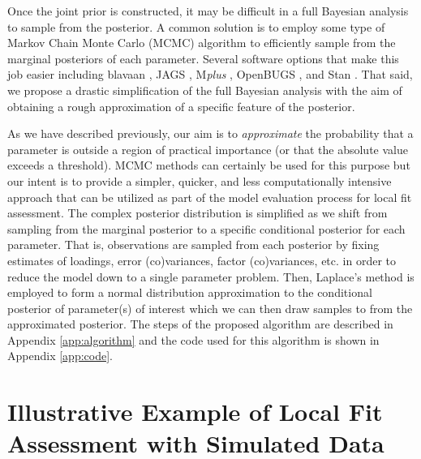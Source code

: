 \documentclass[man, noextraspace, floatsintext, 12pt]{apa7}
\begin{document}
Once the joint prior is constructed, it may be difficult in a full Bayesian analysis to sample from the posterior.
A common solution is to employ some type of Markov Chain Monte Carlo (MCMC) algorithm to efficiently sample from the marginal posteriors of each parameter.
Several software options that make this job easier including blavaan \citep{blavaan}, JAGS \citep{jags}, M\textit{plus} \citep{Mplus}, OpenBUGS \citep{bugs}, and Stan \citep{Stan}.
That said, we propose a drastic simplification of the full Bayesian analysis with the aim of obtaining a rough approximation of a specific feature of the posterior.

As we have described previously, our aim is to \textit{approximate} the probability that a parameter is outside a region of practical importance (or that the absolute value exceeds a threshold).
MCMC methods can certainly be used for this purpose but our intent is to provide a simpler, quicker, and less computationally intensive approach that can be utilized as part of the model evaluation process for local fit assessment.
The complex posterior distribution is simplified as we shift from sampling from the marginal posterior to a specific conditional posterior for each parameter.
That is, observations are sampled from each posterior by fixing estimates of loadings, error (co)variances, factor (co)variances, etc. in order to reduce the model down to a single parameter problem.
Then, Laplace's method is employed to form a normal distribution approximation to the conditional posterior of parameter(s) of interest which we can then draw samples to from the approximated posterior.
The steps of the proposed algorithm are described in Appendix \ref{app:algorithm} and the code used for this algorithm is shown in Appendix \ref{app:code}.


\section{Illustrative Example of Local Fit Assessment with Simulated Data}
\end{document}
